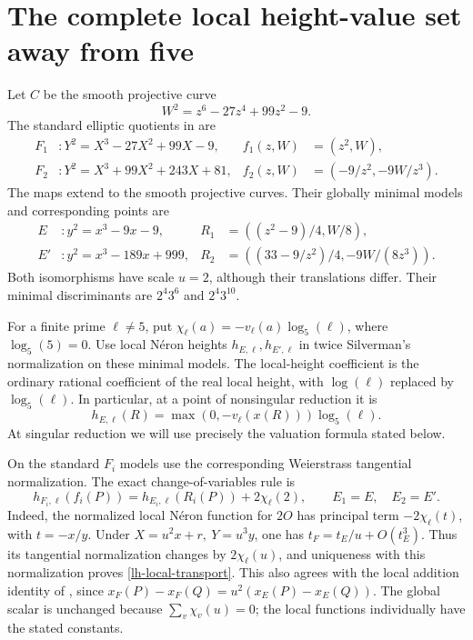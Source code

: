 \section{The complete local height-value set away from five}
\label{sec:local-height-values}

Let \(C\) be the smooth projective curve
\[
 W^2=z^6-27z^4+99z^2-9.
\]
The standard elliptic quotients in
\cite[Theorem~1.4]{BalakrishnanDograQCI} are
\begin{align}
 F_1&:Y^2=X^3-27X^2+99X-9,&
 f_1(z,W)&=(z^2,W),\\
 F_2&:Y^2=X^3+99X^2+243X+81,&
 f_2(z,W)&=(-9/z^2,-9W/z^3).
 \label{lh-standard-maps}
\end{align}
The maps extend to the smooth projective curves. Their globally minimal
models and corresponding points are
\begin{align}
 E&:y^2=x^3-9x-9,&
 R_1&=((z^2-9)/4,W/8),\\
 E'&:y^2=x^3-189x+999,&
 R_2&=((33-9/z^2)/4,-9W/(8z^3)).
 \label{lh-minimal-maps}
\end{align}
Both isomorphisms have scale \(u=2\), although their translations differ.
Their minimal discriminants are \(2^4 3^6\) and \(2^4 3^{10}\).

For a finite prime \(\ell\ne5\), put
\(\chi_\ell(a)=-v_\ell(a)\log_5(\ell)\), where \(\log_5(5)=0\).
Use local N\'eron heights \(h_{E,\ell},h_{E',\ell}\) in twice
Silverman's normalization on these minimal models. The local-height
coefficient is the ordinary rational coefficient of the real local
height, with \(\log(\ell)\) replaced by \(\log_5(\ell)\).
In particular, at a point of nonsingular reduction it is
\[
 h_{E,\ell}(R)=\max(0,-v_\ell(x(R)))\log_5(\ell).
\]
At singular reduction we will use precisely the valuation formula stated
below.

On the standard \(F_i\) models use the corresponding Weierstrass
tangential normalization. The exact change-of-variables rule is
\begin{equation}
 h_{F_i,\ell}(f_i(P))
   =h_{E_i,\ell}(R_i(P))+2\chi_\ell(2),
 \qquad E_1=E,\quad E_2=E'.
 \label{lh-local-transport}
\end{equation}
Indeed, the normalized local N\'eron function for \(2O\) has principal
term \(-2\chi_\ell(t)\), with \(t=-x/y\). Under
\(X=u^2x+r,\ Y=u^3y\), one has
\(t_F=t_E/u+O(t_E^3)\). Thus its tangential normalization changes by
\(2\chi_\ell(u)\), and uniqueness with this normalization proves
\eqref{lh-local-transport}. This also agrees with the local addition
identity of \cite[Lemma~7.4]{BalakrishnanDograQCI}, since
\(x_F(P)-x_F(Q)=u^2(x_E(P)-x_E(Q))\).
The global scalar is unchanged because \(\sum_v\chi_v(u)=0\);
the local functions individually have the stated constants.

